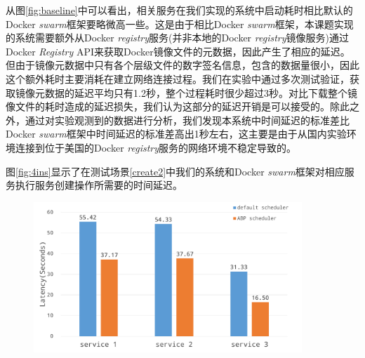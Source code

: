 从图\ref{fig:baseline}中可以看出，相关服务在我们实现的系统中启动耗时相比默认的Docker \emph{swarm}框架要略微高一些。这是由于相比Docker \emph{swarm}框架，本课题实现的系统需要额外从Docker \emph{registry}服务(并非本地的Docker \emph{registry}镜像服务)通过Docker \emph{Registry} API来获取Docker镜像文件的元数据，因此产生了相应的延迟。但由于镜像元数据中只有各个层级文件的数字签名信息，包含的数据量很小，因此这个额外耗时主要消耗在建立网络连接过程。我们在实验中通过多次测试验证，获取镜像元数据的延迟平均只有1.2秒，整个过程耗时很少超过3秒。对比下载整个镜像文件的耗时造成的延迟损失，我们认为这部分的延迟开销是可以接受的。除此之外，通过对实验观测到的数据进行分析，我们发现本系统中时间延迟的标准差比Docker \emph{swarm}框架中时间延迟的标准差高出1秒左右，这主要是由于从国内实验环境连接到位于美国的Docker \emph{registry}服务的网络环境不稳定导致的。

图\ref{fig:4ins}显示了在测试场景\ref{create2}中我们的系统和Docker \emph{swarm}框架对相应服务执行服务创建操作所需要的时间延迟。
\begin{figure}[H]
\centering
\includegraphics[width=0.9\textwidth]{./figure/4ins2rep}
\end{figure}

